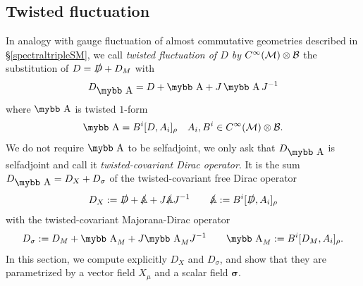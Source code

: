 \documentclass[11pt]{article}
\newcommand{\cinf}{{C^\infty({\cal M})}}
\newcommand{\M}{\mathcal M}
\newcommand{\Ds}{\slashed D}
\newcommand{\sig}{{\boldsymbol{\sigma}}}
\def\bb#1{\hbox{\mybb#1}}
\begin{document}
\subsection{Twisted fluctuation}
In analogy with gauge fluctuation of almost commutative geometries
described in \S\ref{spectraltripleSM}, we call
\emph{twisted fluctuation of $D$ by $C^\infty(\M)\otimes\cal B$} the substitution of $D = \Ds
+ D_M$ with
   \begin{equation}
    \label{eq:143}
    D_{\bb A} = D + \bb A + J\, \bb A\, J^{-1}
  \end{equation}
where $\bb A$ is twisted $1$-form
\begin{equation}
  \label{eq:125}
  \bb A = B^i [D, A_i]_\rho \quad A_i, B^i\in \cinf\otimes\cal B.
\end{equation}
We do not require $\bb A$ to be selfadjoint, we only ask that
$D_{\bb A}$ is selfadjoint and call it \emph{twisted-covariant Dirac operator}. It is the sum 
 $D_{\bb A} = D_X + D_\sigma$
of the twisted-covariant free Dirac operator
\begin{equation}
  \label{eq:26}
  D_X:= \Ds + \slashed {\mathbb A} + J \slashed{\mathbb A} J^{-1} \quad\quad \slashed{\mathbb A} :=
  B^i[\Ds, A_i]_\rho
\end{equation}
with the twisted-covariant Majorana-Dirac operator
\begin{equation}
  \label{eq:27}
  D_\sigma := D_M + \bb A_M + J \bb A_M J^{-1} \quad\quad \bb A_M:= B^i [D_M, A_i]_\rho.
\end{equation}
In this section, we compute explicitly $D_X$ and $D_\sigma$, and show
that they are parametrized by a vector field $X_\mu$ and a scalar
field $\sig$. 
\end{document}
